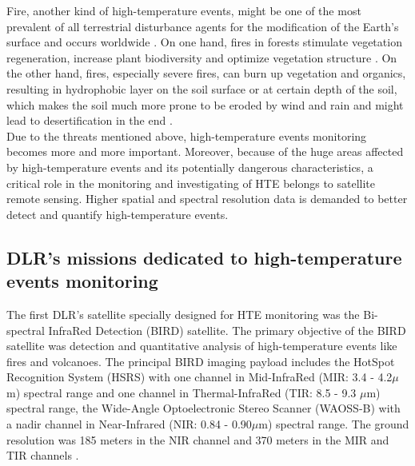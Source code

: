 \noindent Fire, another kind of high-temperature events, might be one of the most prevalent of all terrestrial disturbance agents for the modification of the Earth's surface and occurs worldwide \parencite{Reference6}. On one hand, fires in forests stimulate vegetation regeneration, increase plant biodiversity and optimize vegetation structure \parencite{Reference7}. On the other hand, fires, especially severe fires, can burn up vegetation and organics, resulting in hydrophobic layer on the soil surface or at certain depth of the soil, which makes the soil much more prone to be eroded by wind and rain and might lead to desertification in the end \parencite{Reference8}.\\

\noindent Due to the threats mentioned above, high-temperature events monitoring becomes more and more important. Moreover, because of the huge areas affected by high-temperature events and its potentially dangerous characteristics, a critical role in the monitoring and investigating of HTE belongs to satellite remote sensing. Higher spatial and spectral resolution data is demanded to better detect and quantify high-temperature events.\\


\subsection{DLR's missions dedicated to high-temperature events monitoring}

The first DLR's satellite specially designed for HTE monitoring was the Bi-spectral InfraRed Detection (BIRD) satellite. The primary objective of the BIRD satellite was detection and quantitative analysis of high-temperature events like fires and volcanoes. The principal BIRD imaging payload includes the HotSpot Recognition System (HSRS) with one channel in Mid-InfraRed (MIR: 3.4 - 4.2$\mu$m) spectral range and one channel in Thermal-InfraRed (TIR: 8.5 - 9.3 $\mu$m) spectral range, the Wide-Angle Optoelectronic Stereo Scanner (WAOSS-B) with a nadir channel in Near-Infrared (NIR: 0.84 - 0.90$\mu$m) spectral range. The ground resolution was 185 meters in the NIR channel and 370 meters in the MIR and TIR channels \parencite{Reference9}.\\

